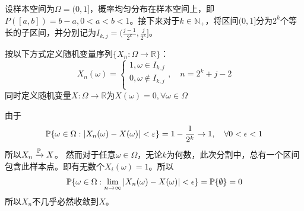 \begin{example}[依概率收敛而不几乎必然收敛]
    设样本空间为$\Omega =(0,1]$，概率均匀分布在样本空间上，即$P([a,b])=b-a,0<a<b<1$。接下来对于$k \in \mathbb{N}_+$，将区间$(0,1]$分为$2^{k}$个等长的子区间，并分别记为$I_{k,j}=(\frac{j-1}{2^k},\frac{j}{2^k}]$。

    按以下方式定义随机变量序列$\{ X_n: \Omega \to \mathbb{R} \}$：
    \[ X_n(\omega)=\begin{cases}
            1, \omega \in I_{k,j}    \\
            0, \omega \notin I_{k,j} \\
        \end{cases} ,\quad n = 2^k+j-2\]
    同时定义随机变量$X: \Omega \to \mathbb{R}$为$X(\omega)=0,\forall \omega \in \Omega$

    由于
    \[ \P\{\omega \in \Omega: \abs{X_n(\omega) - X(\omega)}<\e\}=1-\frac1{2^k} \to 1 ,\quad \forall 0<\epsilon<1 \]
    所以$X_n \xrightarrow{\P} X$。
    然而对于任意$\omega \in \Omega$，无论$k$为何数，此次分割中，总有一个区间包含此样本点。即有无数个$X_i(\omega) = 1$。所以
    \[ \P\{ \omega \in \Omega: \lim_{n \to \infty}\abs{ X_n(\omega) - X(\omega)} < \epsilon \} =\P\{\emptyset \}=0 \]
    所以$X_n$不几乎必然收敛到$X$。
\end{example}

